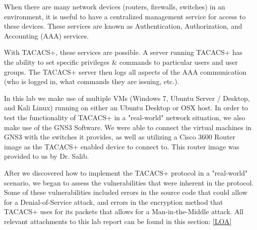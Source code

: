 \documentclass[main.tex]{subfiles}
\begin{document}
\label{intro}
When there are many network devices (routers, firewalls, switches) in an environment, it is useful to have a centralized management service for access to these devices. These services are known as Authentication, Authorization, and Accounting (AAA) services.

With TACACS+, these services are possible. A server running TACACS+ has the ability to set specific privileges & commands to particular users and user groups. The TACACS+ server then logs all aspects of the AAA communication (who is logged in, what commands they are issuing, etc.).

In this lab we make use of multiple VMs (Windows 7, Ubuntu Server / Desktop, and Kali Linux) running on either an Ubuntu Desktop or OSX host. In order to test the functionality of TACACS+ in a "real-world" network situation, we also make use of the GNS3 Software. We were able to connect the virtual machines in GNS3 with the switches it provides, as well as utilizing a Cisco 3600 Router image as the TACACS+ enabled device to connect to. This router image was provided to us by Dr. Salib. 

After we discovered how to implement the TACACS+ protocol in a "real-world" scenario, we began to assess the vulnerabilities that were inherent in the protocol. Some of these vulnerabilities included errors in the source code that could allow for a Denial-of-Service attack, and errors in the encryption method that TACACS+ uses for its packets that allows for a Man-in-the-Middle attack.
\hfill \break
All relevant attachments to this lab report can be found in this section: \ref{LOA}
\end{document}
